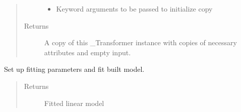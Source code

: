 \documentclass[letterpaper,10pt,english]{sphinxmanual}
\begin{document}
\begin{fulllineitems}
\begin{fulllineitems}
\begin{quote}
\begin{description}
\begin{itemize}
\item {} 
 \textendash{} Keyword arguments to be passed to initialize copy

\end{itemize}

\item[{Returns}] \leavevmode
A copy of this \_Transformer instance with copies of necessary
attributes and empty input.

\end{description}\end{quote}

\end{fulllineitems}


\begin{fulllineitems}
\label{\detokenize{dalio.pipe:dalio.pipe.builders.LinearModel.transform}}
Set up fitting parameters and fit built model.
\begin{quote}\begin{description}
\item[{Returns}] \leavevmode
Fitted linear model

\end{description}\end{quote}

\end{fulllineitems}


\end{fulllineitems}

\end{document}
